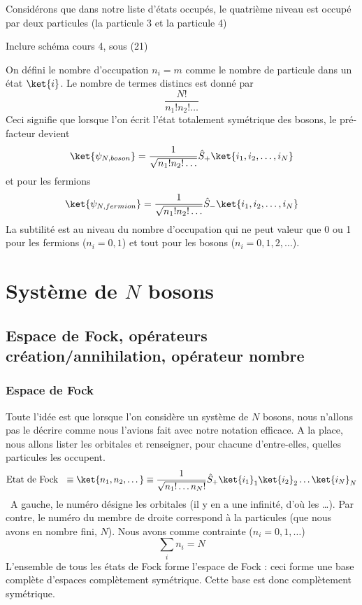 Considérons que dans notre liste d'états occupés, le quatrième niveau est occupé par deux particules (la 
particule 3 et la particule 4)
\begin{center}
Inclure schéma cours 4, sous (21)
\end{center}
On défini le nombre d'occupation $n_i=m$ comme le nombre de particule dans un état $\ket{i}$. Le nombre de 
termes distincs est donné par
\begin{equation}
\dfrac{N!}{n_1!n_2!\dots}
\end{equation}
Ceci signifie que lorsque l'on écrit l'état totalement symétrique des bosons, le pré-facteur devient
\begin{equation}
\ket{\psi_{N,boson}} = \dfrac{1}{\sqrt{n_1!n_2!\dots}}\hat{S}_+\ket{i_1, i_2,\dots,i_N}
\end{equation}
et pour les fermions
\begin{equation}
\ket{\psi_{N,fermion}} = \dfrac{1}{\sqrt{n_1!n_2!\dots}}\hat{S}_-\ket{i_1, i_2,\dots,i_N}
\end{equation}
La subtilité est au niveau du nombre d'occupation qui ne peut valeur que 0 ou 1 pour les fermions ($n_i=0,1$) 
et tout pour les bosons ($n_i=0,1,2,\dots$).


\section{Système de $N$ bosons}
\subsection{Espace de Fock, opérateurs création/annihilation, opérateur nombre}
\subsubsection{Espace de Fock}
Toute l'idée est que lorsque l'on considère un système de $N$ bosons, nous n'allons pas le décrire comme
nous l'avions fait avec notre notation efficace. A la place, nous allons lister les orbitales et renseigner, 
pour chacune d'entre-elles, quelles particules les occupent.
\begin{equation}
\text{Etat de Fock }\ \equiv \ket{n_1,n_2,\dots} \equiv \dfrac{1}{\sqrt{n_1!\dots n_N!}}\hat{S}_+
\ket{i_1}_1\ket{i_2}_2\dots\ket{i_N}_N
\end{equation}
\danger\ A gauche, le numéro désigne les orbitales (il y en a une infinité, d'où les \dots). Par contre, le 
numéro du membre de droite correspond à la particules (que nous avons en nombre fini, $N$). Nous avons 
comme contrainte ($n_i=0,1,\dots$)
\begin{equation}
\sum_i n_i = N
\end{equation}
L'ensemble de tous les états de Fock forme l'espace de Fock : ceci forme une base complète d'espaces complètement 
symétrique. Cette base est donc complètement symétrique.\\

